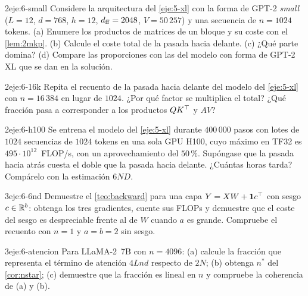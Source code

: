 \begin{ejercicio}{2}{eje:6-small}
Considere la arquitectura del \cref{eje:5-xl} con la forma de GPT-2 \emph{small} ($L=12$, $d=768$, $h=12$, $d_{\mathrm{ff}}=2048$, $V=50\,257$) y una secuencia de $n=1024$ tokens. (a) Enumere los productos de matrices de un bloque y su coste con el \cref{lem:2mkp}. (b) Calcule el coste total de la pasada hacia delante. (c) ¿Qué parte domina? (d) Compare las proporciones con las del modelo con forma de GPT-2 XL que se dan en la solución.
\end{ejercicio}

\begin{ejercicio}{2}{eje:6-16k}
Repita el recuento de la pasada hacia delante del modelo del \cref{eje:5-xl} con $n=16\,384$ en lugar de $1024$. ¿Por qué factor se multiplica el total? ¿Qué fracción pasa a corresponder a los productos $QK^{\top}$ y $AV$?
\end{ejercicio}

\begin{ejercicio}{2}{eje:6-h100}
Se entrena el modelo del \cref{eje:5-xl} durante $400\,000$ pasos con lotes de $1024$ secuencias de $1024$ tokens en una sola GPU H100, cuyo máximo en TF32 es $495\cdot 10^{12}$~FLOP/s, con un aprovechamiento del $50\,\%$. Supóngase que la pasada hacia atrás cuesta el doble que la pasada hacia delante. ¿Cuántas horas tarda? Compárelo con la estimación $6ND$.
\end{ejercicio}

\begin{ejercicio}{3}{eje:6-6nd}
Demuestre el \cref{teo:backward} para una capa $Y=XW+\mathbf{1} c^{\top}$ con sesgo $c\in\mathbb{R}^{b}$: obtenga los tres gradientes, cuente sus FLOPs y demuestre que el coste del sesgo es despreciable frente al de $W$ cuando $a$ es grande. Compruebe el recuento con $n=1$ y $a=b=2$ sin sesgo.
\end{ejercicio}

\begin{ejercicio}{3}{eje:6-atencion}
Para LLaMA-2~7B con $n=4096$: (a) calcule la fracción que representa el término de atención $4Lnd$ respecto de $2N$; (b) obtenga $n^{*}$ del \cref{cor:nstar}; (c) demuestre que la fracción es lineal en $n$ y compruebe la coherencia de (a) y (b).
\end{ejercicio}
